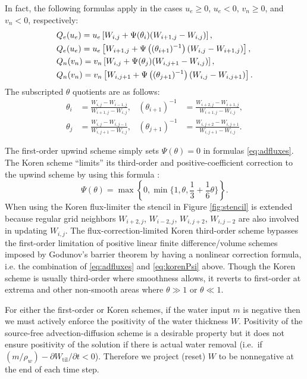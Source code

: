 \documentclass[gmd]{copernicus}   %
\newcommand{\text}{\textrm}
\newcommand{\Wtil}{W_{\text{til}}}
\begin{document}
In fact, the following formulas apply in the cases $u_e \ge 0$, $u_e < 0$, $v_n \ge 0$, and $v_n < 0$, respectively:
\begin{align}
&Q_e(u_e) = u_e \left[W_{i,j} + \Psi(\theta_{i}) (W_{i+1,j} - W_{i,j})\right], \label{eq:adfluxes} \\ 
&Q_e(u_e) = u_e \left[W_{i+1,j} + \Psi\left((\theta_{i+1})^{-1}\right) (W_{i,j} - W_{i+1,j})\right],  \notag \\
&Q_n(v_n) = v_n \left[W_{i,j} + \Psi(\theta_{j}) (W_{i,j+1} - W_{i,j})\right], \notag \\
&Q_n(v_n) = v_n \left[W_{i,j+1} + \Psi\left((\theta_{j+1})^{-1}\right) (W_{i,j} - W_{i,j+1})\right].\notag
\end{align}
The subscripted $\theta$ quotients are as follows:
\begin{align*}
\theta_i &= \frac{W_{i,j}-W_{i-1,j}}{W_{i+1,j} - W_{i,j}}, & (\theta_{i+1})^{-1} &= \frac{W_{i+2,j}-W_{i+1,j}}{W_{i+1,j} - W_{i,j}}, \\
\theta_j &= \frac{W_{i,j}-W_{i,j-1}}{W_{i,j+1} - W_{i,j}}, & (\theta_{j+1})^{-1} &= \frac{W_{i,j+2}-W_{i,j+1}}{W_{i,j+1} - W_{i,j}}.
\end{align*}

The first-order upwind scheme simply sets $\Psi(\theta)=0$ in formulas \eqref{eq:adfluxes}.  The Koren scheme ``limits'' its third-order and positive-coefficient correction to the upwind scheme by using this formula \citep{HundsdorferVerwer2010}:
\begin{equation}
\Psi(\theta) = \max\left\{0,\min\Big\{1,\theta,\frac{1}{3}+\frac{1}{6} \theta\Big\}\right\}.  \label{eq:korenPsi}
\end{equation}
When using the Koren flux-limiter the stencil in Figure \ref{fig:stencil} is extended because regular grid neighbors $W_{i+2,j}$, $W_{i-2,j}$, $W_{i,j+2}$, $W_{i,j-2}$ are also involved in updating $W_{i,j}$.  The flux-correction-limited Koren third-order scheme bypasses the first-order limitation of positive linear finite difference/volume schemes imposed by Godunov's barrier theorem \citep[section I.7.1]{HundsdorferVerwer2010} by having a nonlinear correction formula, i.e. the combination of \eqref{eq:adfluxes} and \eqref{eq:korenPsi} above.  Though the Koren scheme is usually third-order where smoothness allows, it reverts to first-order at extrema and other non-smooth areas where $\theta \gg 1$ or $\theta \ll 1$.

For either the first-order or Koren schemes, if the water input $m$ is negative then we must actively enforce the positivity of the water thickness $W$.  Positivity of the source-free advection-diffusion scheme is a desirable property but it does not ensure positivity of the solution if there is actual water removal (i.e.~if $(m/\rho_w) - \partial \Wtil/\partial t < 0$).  Therefore we project (reset) $W$ to be nonnegative at the end of each time step.
\end{document}
